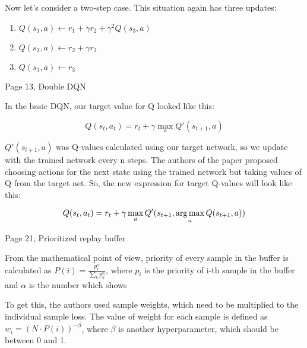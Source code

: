 Now let's consider a two-step case. This situation again has three updates:

\begin{enumerate}
	\item \begin{math}
	Q(s_1,a) \leftarrow r_1 + \gamma r_2 + \gamma^2 Q(s_3,a)
	\end{math}
	\item \begin{math}
	Q(s_2,a) \leftarrow r_2 + \gamma r_3
	\end{math}
	\item \begin{math}
	Q(s_3,a) \leftarrow r_3
	\end{math}
\end{enumerate}


Page 13, Double DQN

In the basic DQN, our target value for Q looked like this:

\begin{equation*}
  Q(s_t, a_t) = r_t + \gamma \max_a Q'(s_{t+1},a)
\end{equation*}

\begin{math}Q'(s_{t+1}, a)\end{math} was Q-values calculated using our target network, so we update with the trained network every n steps. The authors of the paper proposed choosing actions for the next state using the trained network but taking values of Q from the target net. So, the new expression for target Q-values will look like this:

\begin{equation*}
  Q(s_t, a_t) = r_t + \gamma \max_a Q'(s_{t+1},\operatorname*{arg\,max}_a Q(s_{t+1}, a))
\end{equation*}


Page 21, Prioritized replay buffer

From the mathematical point of view, priority of every sample in the buffer is
calculated as \begin{math}P(i) = \frac{p_i^\alpha}{\sum_kp_k^\alpha}\end{math}, where $p_i$ is the priority of i-th sample in the buffer and $\alpha$ is
the number which shows


To get this, the authors used sample weights, which need to be multiplied to the
individual sample loss. The value of weight for each sample is defined as
\begin{math}w_i=(N \cdot P(i))^{-\beta}\end{math},
where \begin{math}\beta\end{math} is another hyperparameter, which should be between 0 and 1.

